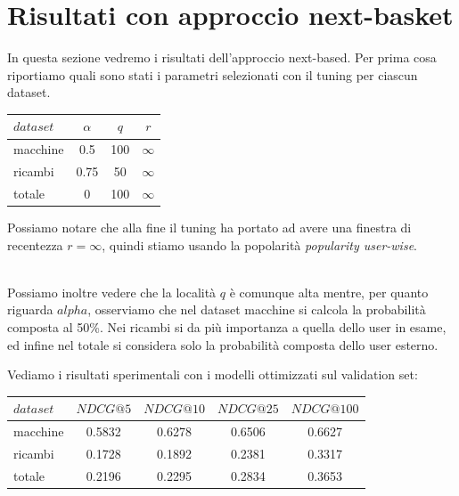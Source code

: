 \section{Risultati con approccio next-basket}
In questa sezione vedremo i risultati dell'approccio next-based. Per prima cosa riportiamo quali sono stati i parametri selezionati con il tuning per ciascun dataset.\\

\begin{minipage}[H]{0.45\textwidth}
    \begin{tabular}{|l|ccc|}
        \toprule
        $dataset$ &    $\alpha$ &  $q$ & $r$ \\
        \midrule
        macchine & 0.5 & 100 & $\infty$ \\
        ricambi  &	0.75 & 50 & $\infty$ \\
        totale  & 0 & 100 & $\infty$ \\
    \bottomrule
    \end{tabular}
\end{minipage}
\begin{minipage}[H]{0.55\textwidth}
    Possiamo notare che alla fine il tuning ha portato ad avere una finestra di recentezza  $r = \infty$, quindi stiamo usando la popolarità \textit{popularity user-wise}. 
\end{minipage}\\

Possiamo inoltre vedere che la località $q$ è comunque alta mentre, per quanto riguarda $alpha$, osserviamo che nel dataset macchine si calcola la probabilità composta al 50\%. Nei ricambi si da più importanza a quella dello user in esame, ed infine nel totale si considera solo la probabilità composta dello user esterno.

Vediamo i risultati sperimentali con i modelli ottimizzati sul validation set:\\

\begin{tabular}{|l|cccc|}
    \toprule
    $dataset$  &  $NDCG@5$ & $NDCG@10$  & $NDCG@25$ & $NDCG@100$  \\
    \midrule
    macchine & 0.5832 & 0.6278 & 0.6506 & 0.6627 \\
    ricambi & 0.1728 & 0.1892 & 0.2381 & 0.3317 \\
    totale  & 0.2196 & 0.2295 & 0.2834 & 0.3653 \\
\bottomrule
\end{tabular}\\

